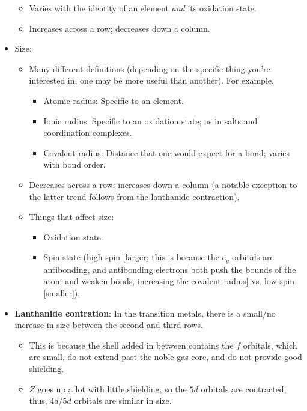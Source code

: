 \documentclass[../notes.tex]{subfiles}
\begin{document}
\begin{itemize}
    \begin{itemize}
        \item Varies with the identity of an element \emph{and} its oxidation state.
        \item Increases across a row; decreases down a column.
    \end{itemize}
    \item Size:
    \begin{itemize}
        \item Many different definitions (depending on the specific thing you're interested in, one may be more useful than another). For example,
        \begin{itemize}
            \item Atomic radius: Specific to an element.
            \item Ionic radius: Specific to an oxidation state; as in salts and coordination complexes.
            \item Covalent radius: Distance that one would expect for a bond; varies with bond order.
        \end{itemize}
        \item Decreases across a row; increases down a column (a notable exception to the latter trend follows from the lanthanide contraction).
        \item Things that affect size:
        \begin{itemize}
            \item Oxidation state.
            \item Spin state (high spin [larger; this is because the $e_g$ orbitals are antibonding, and antibonding electrons both push the bounds of the atom and weaken bonds, increasing the covalent radius] vs. low spin [smaller]).
        \end{itemize}
    \end{itemize}
    \item \textbf{Lanthanide contration}: In the transition metals, there is a small/no increase in size between the second and third rows.
    \begin{itemize}
        \item This is because the shell added in between contains the $f$ orbitals, which are small, do not extend past the noble gas core, and do not provide good shielding.
        \item $Z$ goes up a lot with little shielding, so the $5d$ orbitals are contracted; thus, $4d$/$5d$ orbitals are similar in size.
    \end{itemize}

\end{itemize}
\end{document}

